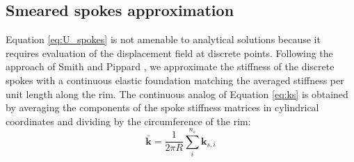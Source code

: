 \documentclass[\rootdir/thesis.tex]{subfiles}
\begin{document}






\subsection{Smeared spokes approximation}
\label{sec:smeared_spokes}
Equation \ref{eq:U_spokes} is not amenable to analytical solutions because it requires evaluation of the displacement field at discrete points. Following the approach of Smith \cite{Smith1901} and Pippard \cite{Pippard1931}, we approximate the stiffness of the discrete spokes with a continuous elastic foundation matching the averaged stiffness per unit length along the rim. The continuous analog of Equation \eqref{eq:ks} is obtained by averaging the components of the spoke stiffness matrices in cylindrical coordinates and dividing by the circumference of the rim:
\begin{equation}
\label{eq:k_bar}
\mathbf{\bar{k}} = \frac{1}{2\pi R} \sum_i^{n_s} \mathbf{k}_{s,i}
\end{equation}
\end{document}
